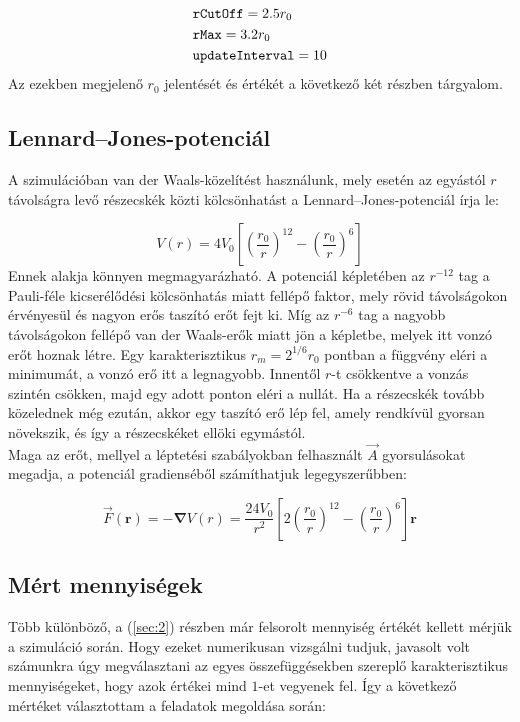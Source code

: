 \begin{multicols}{2}
\begin{align*}
    &\text{\texttt{rCutOff}} = 2.5 r_{0} \\
    &\text{\texttt{rMax}} = 3.2 r_{0} \\
    &\text{\texttt{updateInterval}} = 10
\end{align*}
Az ezekben megjelenő $r_{0}$ jelentését és értékét a következő két részben tárgyalom.

\subsection{Lennard--Jones-potenciál} \label{sub:3.2}
A szimulációban van der Waals-közelítést használunk, mely esetén az egyástól $r$ távolságra levő részecskék közti kölcsönhatást a Lennard--Jones-potenciál\cite{1924RSPSA.106..463J} írja le:

\begin{equation}
    V \left( r \right)
    =
    4 V_{0} \left[ \left( \frac{r_{0}}{r} \right)^{12} - \left( \frac{r_{0}}{r} \right)^{6} \right]
\end{equation}
Ennek alakja könnyen megmagyarázható. A potenciál képletében az $r^{-12}$ tag a Pauli-féle kicserélődési kölcsönhatás miatt fellépő faktor, mely rövid távolságokon érvényesül és nagyon erős taszító erőt fejt ki. Míg az $r^{-6}$ tag a nagyobb távolságokon fellépő van der Waals-erők miatt jön a képletbe, melyek itt vonzó erőt hoznak létre. Egy karakterisztikus $r_{m} = 2^{1/6} r_{0}$ pontban a függvény eléri a minimumát, a vonzó erő itt a legnagyobb. Innentől $r$-t csökkentve a vonzás szintén csökken, majd egy adott ponton eléri a nullát. Ha a részecskék tovább közelednek még ezután, akkor egy taszító erő lép fel, amely rendkívül gyorsan növekszik, és így a részecskéket ellöki egymástól. \\
Maga az erőt, mellyel a léptetési szabályokban felhasznált $\vec{A}$ gyorsulásokat megadja, a potenciál gradienséből számíthatjuk legegyszerűbben:

\begin{equation}
    \vec{F} \left( \boldsymbol{r} \right)
    =
    - \boldsymbol{\nabla} V \left( r \right)
    =
    \frac{24 V_{0}}{r^{2}} \left[ 2 \left( \frac{r_{0}}{r} \right)^{12} - \left( \frac{r_{0}}{r} \right)^{6} \right] \boldsymbol{r}
\end{equation}

\subsection{Mért mennyiségek} \label{sub:3.3}
Több különböző, a (\ref{sec:2}) részben már felsorolt mennyiség értékét kellett mérjük a szimuláció során. Hogy ezeket numerikusan vizsgálni tudjuk, javasolt volt számunkra úgy megválasztani az egyes összefüggésekben szereplő karakterisztikus mennyiségeket, hogy azok értékei mind $1$-et vegyenek fel. Így a következő mértéket választottam a feladatok megoldása során:


\end{multicols}
